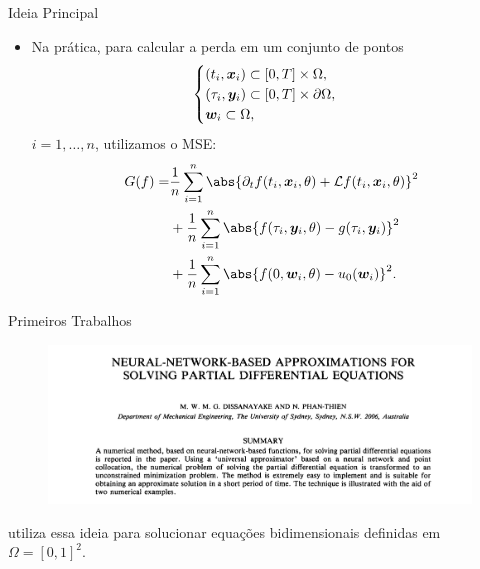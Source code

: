 \documentclass[13pt]{beamer}
\begin{document}
\begin{frame}{Ideia Principal}
    \begin{itemize}
        \item<1-> Na prática, para calcular a perda em um conjunto de pontos
            \begin{equation*}
                \begin{cases}
                    ( t_{ i }, \bm{x}_{ i } ) \subset [0, T] \times \Omega, \\
                    ( \tau_{ i }, \bm{y}_{ i } ) \subset [0, T] \times \partial \Omega, \\
                    \bm{w}_{ i } \subset \Omega,
                \end{cases}
            \end{equation*}
            \( i = 1, \dots, n \), utilizamos o MSE:
            \begin{align*}
                G ( f ) = &\frac{ 1 }{ n } \sum_{ i=1 }^{ n } \abs{ \partial_{ t } f ( t_{ i }, \bfx_{ i }, \theta ) + \mathcal{L} f ( t_{ i }, \bfx_{ i }, \theta ) }^2 \\
                    &+ \frac{ 1 }{ n } \sum_{ i=1 }^{ n } \abs{ f ( \tau_{ i }, \bfy_{ i }, \theta ) - g ( \tau_{ i }, \bfy_{ i } ) }^2 \\
                    &+ \frac{ 1 }{ n } \sum_{ i=1 }^{ n } \abs{ f ( 0, \bfw_{ i }, \theta ) - u_{ 0 } ( \bfw_{ i } ) }^2
            .\end{align*}
    \end{itemize}
\end{frame}

\begin{frame}{Primeiros Trabalhos}
    \begin{figure}[htb]
        \includegraphics[width=\textwidth]{../figuras/seminal-1994.png}
    \end{figure}
    \cite{dissanayake94} utiliza essa ideia para solucionar equações bidimensionais definidas em \( \Omega = [0, 1]^2 \).
\end{frame}
\end{document}
